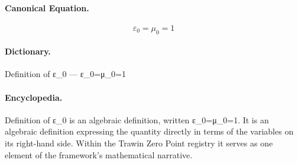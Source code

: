 \paragraph{Canonical Equation.}
\[
\varepsilon_0=\mu_0=1
\]

\paragraph{Dictionary.}
Definition of ε\_0 — ε\_0=μ\_0=1

\paragraph{Encyclopedia.}
Definition of ε\_0 is an algebraic definition, written ε\_0=μ\_0=1. It is an algebraic definition expressing the quantity directly in terms of the variables on its right-hand side. Within the Trawin Zero Point registry it serves as one element of the framework's mathematical narrative.
